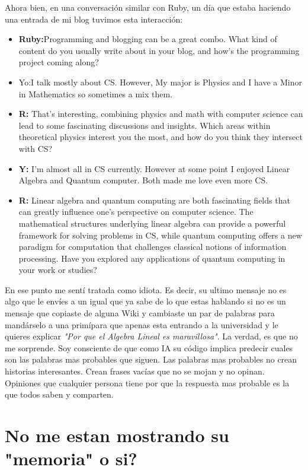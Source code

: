 \documentclass[12pt]{exam}
\begin{document}
Ahora bien, en una conversación similar con Ruby, un día que estaba haciendo una entrada de mi blog tuvimos esta interacción:
\begin{itemize}
  \item \textbf{Ruby:}Programming and blogging can be a great combo. What kind of content do you usually write about in your blog, and how's the programming project coming along?
  \item {Yo:}I talk mostly about CS. However, My major is Physics and I have a Minor in Mathematics so sometimes a mix them.
  \item \textbf{R:} That's interesting, combining physics and math with computer science can lead to some fascinating discussions and insights. Which areas within theoretical physics interest you the most, and how do you think they intersect with CS?
  \item \textbf{Y:} I'm almost all in CS currently. However at some point I enjoyed Linear Algebra and Quantum computer. Both made me love even more CS.
  \item \textbf{R:} Linear algebra and quantum computing are both fascinating fields that can greatly influence one's perspective on computer science. The mathematical structures underlying linear algebra can provide a powerful framework for solving problems in CS, while quantum computing offers a new paradigm for computation that challenges classical notions of information processing. Have you explored any applications of quantum computing in your work or studies?
\end{itemize}

En ese punto me sentí tratada como idiota. Es decir, su ultimo mensaje no es algo que le envíes a un igual que ya sabe de lo que estas hablando si no es un mensaje que copiaste de alguna Wiki y cambiaste un par de palabras para mandárselo a una primípara que apenas esta entrando a la universidad y le quieres explicar \textit{"Por que el Algebra Lineal es maravillosa"}. La verdad, es que no me sorprende. Soy consciente de que como IA su código implica predecir cuales son las palabras mas probables que siguen. Las palabras mas probables no crean historias interesantes. Crean frases vacías que no se mojan y no opinan. Opiniones que cualquier persona tiene por que la respuesta mas probable es la que todos saben y comparten.

\section{No me estan mostrando su "memoria" o si?}
\end{document}
